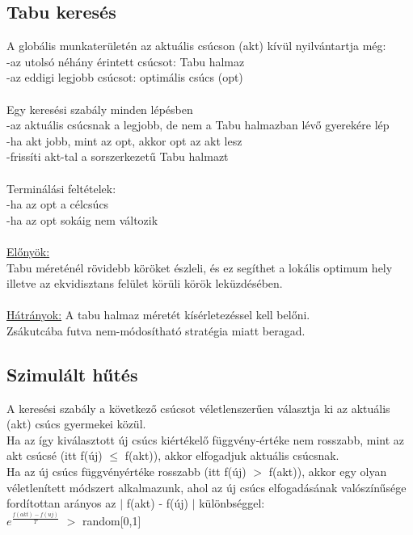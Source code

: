 \documentclass{article}
\begin{document}
	 \subsection{Tabu keresés}
	 A globális munkaterületén az aktuális csúcson (akt) kívül nyilvántartja még:\\
	 \hspace*{0,5em} -az utolsó néhány érintett csúcsot: Tabu halmaz\\
	 \hspace*{0,5em} -az eddigi legjobb csúcsot: optimális csúcs (opt)\\ \\
	 Egy keresési szabály minden lépésben\\
	 \hspace*{0,5em} -az aktuális csúcsnak a legjobb, de nem a Tabu halmazban lévő gyerekére lép\\
	 \hspace*{0,5em} -ha akt jobb, mint az opt, akkor opt az akt lesz\\
	 \hspace*{0,5em} -frissíti akt-tal a sorszerkezetű Tabu halmazt\\ \\
	 Terminálási feltételek:\\
	 \hspace*{0,5em} -ha az opt a célcsúcs\\
	 \hspace*{0,5em} -ha az opt sokáig nem változik \\ \\
	 \underline{Előnyök:}\\
	 Tabu méreténél rövidebb köröket észleli, és ez segíthet a lokális optimum hely illetve az ekvidisztans felület körüli körök leküzdésében.\\ \\
	 \underline{Hátrányok:}
	 A tabu halmaz méretét kísérletezéssel kell belőni. \\
	 Zsákutcába futva nem-módosítható stratégia miatt beragad.
	 
	 \subsection{Szimulált hűtés}
	 A keresési szabály a következő csúcsot véletlenszerűen választja ki az aktuális (akt) csúcs gyermekei közül.\\
	 Ha az így kiválasztott új csúcs kiértékelő függvény-értéke nem rosszabb, mint az akt csúcsé (itt f(új) $\leq$ f(akt)), akkor elfogadjuk aktuális csúcsnak.\\
	 Ha az új csúcs függvényértéke rosszabb (itt f(új) $>$ f(akt)), akkor egy olyan véletlenített módszert alkalmazunk, ahol az új csúcs elfogadásának valószínűsége fordítottan arányos az $|$ f(akt) - f(új) $|$ különbséggel: \\
	 $e^\frac{f(akt)-f(uj)}{T}$ $>$ random[0,1] \\
	 
\end{document}
